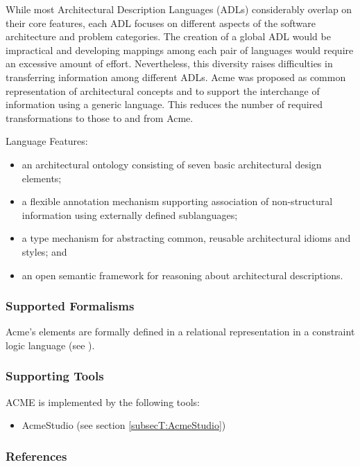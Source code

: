 
While most Architectural Description Languages (ADLs) considerably overlap on their core features, each ADL focuses on different aspects of the software architecture and problem categories. 
The creation of a global ADL would be impractical and developing mappings among each pair of languages would require an excessive amount of effort.
Nevertheless, this diversity raises difficulties in transferring information among different ADLs. 
Acme was proposed as common representation of architectural concepts and to support the interchange of information using a generic language. 
This reduces the number of required transformations to those to and from Acme.

Language Features:
\begin{itemize}
    \item an architectural ontology consisting of seven basic architectural design elements;
    \item a flexible annotation mechanism supporting association of non-structural information using externally defined sublanguages;
    \item a type mechanism for abstracting common, reusable architectural idioms and styles; and
    \item an open semantic framework for reasoning about architectural descriptions.
\end{itemize}

\subsubsection{Supported Formalisms}

Acme's elements are formally defined in a relational representation in a constraint logic language (see \cite{Wile1996acme}).


\subsubsection{Supporting Tools}
ACME is implemented by the following tools:
\begin{itemize}
    \item AcmeStudio (see section \ref{subsecT:AcmeStudio})
\end{itemize}


\subsubsection{References}
\cite{garlan1997acme}
\cite{garlan2000acme}
\cite{Wile1996acme}




